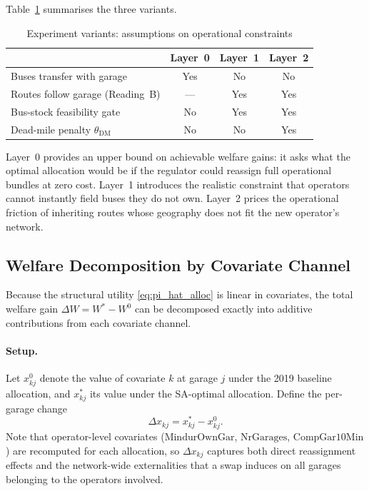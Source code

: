 \documentclass[12pt]{article}
\begin{document}
Table~\ref{tab:experiment_variants} summarises the three variants.

\begin{table}[h]
\centering
\caption{Experiment variants: assumptions on operational constraints}
\label{tab:experiment_variants}
\begin{tabular}{lccc}
\hline
 & Layer~0 & Layer~1 & Layer~2 \\
\hline
Buses transfer with garage       & Yes & No  & No  \\
Routes follow garage (Reading~B) & ---  & Yes & Yes \\
Bus-stock feasibility gate       & No  & Yes & Yes \\
Dead-mile penalty $\theta_{\text{DM}}$ & No & No & Yes \\
\hline
\end{tabular}
\end{table}

\noindent
Layer~0 provides an upper bound on achievable welfare gains: it asks what
the optimal allocation would be if the regulator could reassign full
operational bundles at zero cost.  Layer~1 introduces the realistic
constraint that operators cannot instantly field buses they do not own.
Layer~2 prices the operational friction of inheriting routes whose
geography does not fit the new operator's network.

\subsection{Welfare Decomposition by Covariate Channel}

Because the structural utility \eqref{eq:pi_hat_alloc} is linear in
covariates, the total welfare gain $\Delta W = W^* - W^0$ can be
decomposed exactly into additive contributions from each covariate
channel.

\paragraph{Setup.}
Let $x_{kj}^0$ denote the value of covariate $k$ at garage $j$ under the
2019 baseline allocation, and $x_{kj}^*$ its value under the SA-optimal
allocation.  Define the per-garage change
\[
  \Delta x_{kj} = x_{kj}^* - x_{kj}^0.
\]
Note that operator-level covariates ($\text{MindurOwnGar}$,
$\text{NrGarages}$, $\text{CompGar10Min}$) are recomputed for each
allocation, so $\Delta x_{kj}$ captures both direct reassignment effects
and the network-wide externalities that a swap induces on all garages
belonging to the operators involved.
\end{document}
